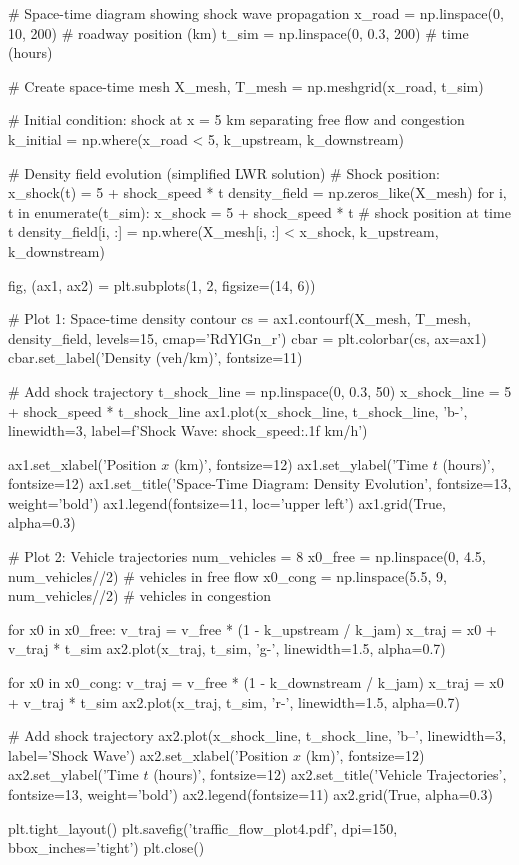 \documentclass[11pt,a4paper]{article}
\begin{document}
\begin{pycode}
# Space-time diagram showing shock wave propagation
x_road = np.linspace(0, 10, 200)  # roadway position (km)
t_sim = np.linspace(0, 0.3, 200)  # time (hours)

# Create space-time mesh
X_mesh, T_mesh = np.meshgrid(x_road, t_sim)

# Initial condition: shock at x = 5 km separating free flow and congestion
k_initial = np.where(x_road < 5, k_upstream, k_downstream)

# Density field evolution (simplified LWR solution)
# Shock position: x_shock(t) = 5 + shock_speed * t
density_field = np.zeros_like(X_mesh)
for i, t in enumerate(t_sim):
    x_shock = 5 + shock_speed * t  # shock position at time t
    density_field[i, :] = np.where(X_mesh[i, :] < x_shock, k_upstream, k_downstream)

fig, (ax1, ax2) = plt.subplots(1, 2, figsize=(14, 6))

# Plot 1: Space-time density contour
cs = ax1.contourf(X_mesh, T_mesh, density_field, levels=15, cmap='RdYlGn_r')
cbar = plt.colorbar(cs, ax=ax1)
cbar.set_label('Density (veh/km)', fontsize=11)

# Add shock trajectory
t_shock_line = np.linspace(0, 0.3, 50)
x_shock_line = 5 + shock_speed * t_shock_line
ax1.plot(x_shock_line, t_shock_line, 'b-', linewidth=3, label=f'Shock Wave: {shock_speed:.1f} km/h')

ax1.set_xlabel('Position $x$ (km)', fontsize=12)
ax1.set_ylabel('Time $t$ (hours)', fontsize=12)
ax1.set_title('Space-Time Diagram: Density Evolution', fontsize=13, weight='bold')
ax1.legend(fontsize=11, loc='upper left')
ax1.grid(True, alpha=0.3)

# Plot 2: Vehicle trajectories
num_vehicles = 8
x0_free = np.linspace(0, 4.5, num_vehicles//2)  # vehicles in free flow
x0_cong = np.linspace(5.5, 9, num_vehicles//2)  # vehicles in congestion

for x0 in x0_free:
    v_traj = v_free * (1 - k_upstream / k_jam)
    x_traj = x0 + v_traj * t_sim
    ax2.plot(x_traj, t_sim, 'g-', linewidth=1.5, alpha=0.7)

for x0 in x0_cong:
    v_traj = v_free * (1 - k_downstream / k_jam)
    x_traj = x0 + v_traj * t_sim
    ax2.plot(x_traj, t_sim, 'r-', linewidth=1.5, alpha=0.7)

# Add shock trajectory
ax2.plot(x_shock_line, t_shock_line, 'b--', linewidth=3, label='Shock Wave')
ax2.set_xlabel('Position $x$ (km)', fontsize=12)
ax2.set_ylabel('Time $t$ (hours)', fontsize=12)
ax2.set_title('Vehicle Trajectories', fontsize=13, weight='bold')
ax2.legend(fontsize=11)
ax2.grid(True, alpha=0.3)

plt.tight_layout()
plt.savefig('traffic_flow_plot4.pdf', dpi=150, bbox_inches='tight')
plt.close()
\end{pycode}
\end{document}
